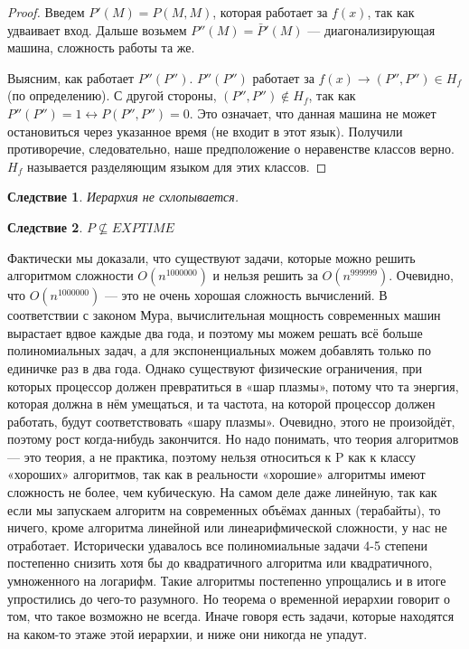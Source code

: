 \documentclass[a4paper]{article}
\newtheorem{consequence}{Следствие}
\begin{document}
{\begin{proof}
Введем $P'(M) = P(M, M)$, которая работает за $f(x)$, так как удваивает вход. Дальше возьмем $P''(M) = \bar P'(M)$ — диагонализирующая машина, сложность работы та же.

Выясним, как работает $P''(P'')$. $P''(P'')$ работает за $f(x) \rightarrow (P'', P'') \in H_{f}$ (по определению). С другой стороны, $(P'', P'') \notin H_{f}$, так как $P''(P'') = 1 \leftrightarrow P(P'', P'') = 0$. Это означает, что данная машина не может остановиться через указанное время (не входит в этот язык). Получили противоречие, следовательно, наше предположение о неравенстве классов верно. $H_{f}$ называется разделяющим языком для этих классов.
\end{proof}

\begin{consequence}
Иерархия не схлопывается.
\end{consequence}

\begin{consequence}
$P \nsubseteq EXPTIME$
\end{consequence}

Фактически мы доказали, что существуют задачи, которые можно решить алгоритмом сложности $O(n^{1000000})$ и нельзя решить за $O(n^{999999})$. Очевидно, что $O(n^{1000000})$ — это не очень хорошая сложность вычислений. В соответствии с законом Мура, вычислительная мощность современных машин вырастает вдвое каждые два года, и поэтому мы можем решать всё больше полиномиальных задач, а для экспоненциальных можем добавлять только по единичке раз в два года. Однако существуют физические ограничения, при которых процессор должен превратиться в «шар плазмы», потому что та энергия, которая должна в нём умещаться, и та частота, на которой процессор должен работать, будут соответствовать «шару плазмы». Очевидно, этого не произойдёт, поэтому рост когда-нибудь закончится. Но надо понимать, что теория алгоритмов — это теория, а не практика, поэтому нельзя относиться к P как к классу «хороших» алгоритмов, так как в реальности «хорошие» алгоритмы имеют сложность не более, чем кубическую. На самом деле даже линейную, так как если мы запускаем алгоритм на современных объёмах данных (терабайты), то ничего, кроме алгоритма линейной или линеарифмической сложности, у нас не отработает. Исторически удавалось все полиномиальные задачи 4-5 степени постепенно снизить хотя бы до квадратичного алгоритма или квадратичного, умноженного на логарифм. Такие алгоритмы постепенно упрощались и в итоге упростились до чего-то разумного. Но теорема о временной иерархии говорит о том, что такое возможно не всегда. Иначе говоря есть задачи, которые находятся на каком-то этаже этой иерархии, и ниже они никогда не упадут.

}
\end{document}
